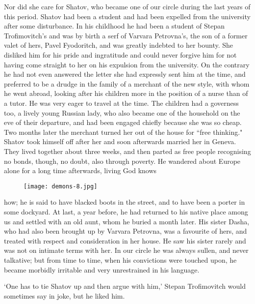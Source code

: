 \documentclass[12pt]{article}
\begin{document}
\vspace{12pt}
Nor did she care for Shatov, who became one of our circle during the
last years of this period. Shatov had been a student and had been
expelled from the university after some disturbance. In his childhood he
had been a student of Stepan Trofimovitch's and was by birth a serf of
Varvara Petrovna's, the son of a former valet of hers, Pavel Fyodoritch,
and was greatly indebted to her bounty. She disliked him for his pride
and ingratitude and could never forgive him for not having come straight
to her on his expulsion from the university. On the contrary he had not
even answered the letter she had expressly sent him at the time, and
preferred to be a drudge in the family of a merchant of the new style,
with whom he went abroad, looking after his children more in the
position of a nurse than of a tutor. He was very eager to travel at the
time. The children had a governess too, a lively young Russian lady, who
also became one of the household on the eve of their departure, and
had been engaged chiefly because she was so cheap. Two months later the
merchant turned her out of the house for ``free thinking." Shatov took
himself off after her and soon afterwards married her in Geneva.
They lived together about three weeks, and then parted as free people
recognising no bonds, though, no doubt, also through poverty. He
wandered about Europe alone for a long time afterwards, living God knows
\begin{figure}[!ht]
\begin{center}
\texttt{[image: demons-8.jpg]}
\end{center}
\end{figure}
how; he is said to have blacked boots in the street, and to have been a
porter in some dockyard. At last, a year before, he had returned to his
native place among us and settled with an old aunt, whom he buried a
month later. His sister Dasha, who had also been brought up by Varvara
Petrovna, was a favourite of hers, and treated with respect and
consideration in her house. He saw his sister rarely and was not on
intimate terms with her. In our circle he was always sullen, and never
talkative; but from time to time, when his convictions were touched
upon, he became morbidly irritable and very unrestrained in his
language.


\vspace{12pt}
`One has to tie Shatov up and then argue with him,' Stepan Trofimovitch
would sometimes say in joke, but he liked him.
\end{document}
